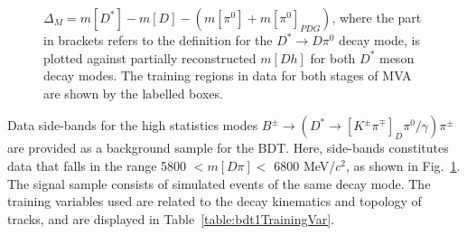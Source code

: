 \documentclass[oneside,12pt]{article}
\begin{document}
\begin{figure}[H]
\centering
{}
\caption{\small{$\Delta_M=m[D^{*}] - m[D]- (m[\pi^0] +
m[\pi^0]_{PDG})$, where the part in brackets refers to the definition for the
$D^*\rightarrow D\pi^0$ decay mode, is plotted against partially reconstructed
$m[Dh]$ for both $D^*$ meson decay modes. The training regions in data for
both stages of MVA are shown by the labelled boxes.}}
\label{fig:trainingData}
\end{figure}

Data side-bands for the high statistics modes $B^{\pm}\rightarrow(D^{*}
\rightarrow [K^{\pm}\pi^{\mp}]_{D} \pi^0 /\gamma)\pi^{\pm}$ are provided as a
background sample for the BDT. Here, side-bands constitutes data that falls in
the range 5800 $ < m[D\pi] <$ 6800 MeV/$c^2$, as shown in
Fig.~\ref{fig:trainingData}. The signal sample consists of simulated events of
the same decay mode. The training variables used are related to the decay
kinematics and topology of tracks, and are displayed in
Table~\ref{table:bdt1TrainingVar}. 
\end{document}
